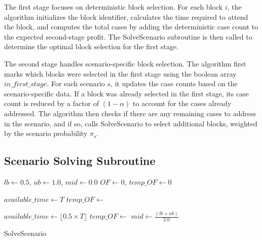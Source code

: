 The first stage focuses on deterministic block selection.
For each block $i$, the algorithm initializes the block identifier,
calculates the time required to attend the block, and computes the total cases by adding the
deterministic case count to the expected second-stage profit. The SolveScenario
subroutine is then called to determine the optimal block selection for the first stage.

The second stage handles scenario-specific block selection.
The algorithm first marks which blocks were selected in the first stage
using the boolean array $in\_first\_stage$. For each scenario $s$, it updates
the case counts based on the scenario-specific data. If a block was already selected
in the first stage, its case count is reduced by a factor of $(1-\alpha)$ to account
for the cases already addressed. The algorithm then checks if there are any remaining
cases to address in the scenario, and if so, calls SolveScenario to select additional
blocks, weighted by the scenario probability $\pi_s$.

\subsection{Scenario Solving Subroutine}

\begin{algorithm}[H]
	\SetAlgoLined

	$lb \leftarrow 0.5$, $ub \leftarrow 1.0$, $mid \leftarrow 0.0$\;
	$OF \leftarrow 0$, $temp\_OF \leftarrow 0$\;

	$available\_time \leftarrow T$\;
	$temp\_OF \leftarrow$ \;

	$available\_time \leftarrow \lfloor 0.5 \times T \rfloor$\;
	$temp\_OF \leftarrow$ \;
	$mid \leftarrow \frac{(lb + ub)}{2.0}$\;


	\;
	\caption{SolveScenario}
\end{algorithm}

